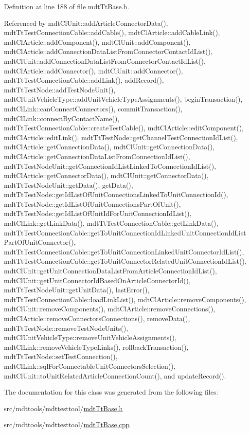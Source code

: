 Definition at line 188 of file mdt\-Tt\-Base.\-h.



Referenced by mdt\-Cl\-Unit\-::add\-Article\-Connector\-Data(), mdt\-Tt\-Test\-Connection\-Cable\-::add\-Cable(), mdt\-Cl\-Article\-::add\-Cable\-Link(), mdt\-Cl\-Article\-::add\-Component(), mdt\-Cl\-Unit\-::add\-Component(), mdt\-Cl\-Article\-::add\-Connection\-Data\-List\-From\-Connector\-Contact\-Id\-List(), mdt\-Cl\-Unit\-::add\-Connection\-Data\-List\-From\-Connector\-Contact\-Id\-List(), mdt\-Cl\-Article\-::add\-Connector(), mdt\-Cl\-Unit\-::add\-Connector(), mdt\-Tt\-Test\-Connection\-Cable\-::add\-Link(), add\-Record(), mdt\-Tt\-Test\-Node\-::add\-Test\-Node\-Unit(), mdt\-Cl\-Unit\-Vehicle\-Type\-::add\-Unit\-Vehicle\-Type\-Assignments(), begin\-Transaction(), mdt\-Cl\-Link\-::can\-Connect\-Connectors(), commit\-Transaction(), mdt\-Cl\-Link\-::connect\-By\-Contact\-Name(), mdt\-Tt\-Test\-Connection\-Cable\-::create\-Test\-Cable(), mdt\-Cl\-Article\-::edit\-Component(), mdt\-Cl\-Article\-::edit\-Link(), mdt\-Tt\-Test\-Node\-::get\-Channel\-Test\-Connection\-Id\-List(), mdt\-Cl\-Article\-::get\-Connection\-Data(), mdt\-Cl\-Unit\-::get\-Connection\-Data(), mdt\-Cl\-Article\-::get\-Connection\-Data\-List\-From\-Connection\-Id\-List(), mdt\-Tt\-Test\-Node\-Unit\-::get\-Connection\-Id\-List\-Linked\-To\-Connection\-Id\-List(), mdt\-Cl\-Article\-::get\-Connector\-Data(), mdt\-Cl\-Unit\-::get\-Connector\-Data(), mdt\-Tt\-Test\-Node\-Unit\-::get\-Data(), get\-Data(), mdt\-Tt\-Test\-Node\-::get\-Id\-List\-Of\-Unit\-Connections\-Linked\-To\-Unit\-Connection\-Id(), mdt\-Tt\-Test\-Node\-::get\-Id\-List\-Of\-Unit\-Connections\-Part\-Of\-Unit(), mdt\-Tt\-Test\-Node\-::get\-Id\-List\-Of\-Unit\-Id\-For\-Unit\-Connection\-Id\-List(), mdt\-Cl\-Link\-::get\-Link\-Data(), mdt\-Tt\-Test\-Connection\-Cable\-::get\-Link\-Data(), mdt\-Tt\-Test\-Connection\-Cable\-::get\-To\-Unit\-Connection\-Id\-Linked\-Unit\-Connection\-Id\-List\-Part\-Of\-Unit\-Connector(), mdt\-Tt\-Test\-Connection\-Cable\-::get\-To\-Unit\-Connection\-Linked\-Unit\-Connector\-Id\-List(), mdt\-Tt\-Test\-Connection\-Cable\-::get\-To\-Unit\-Connector\-Related\-Unit\-Connection\-Id\-List(), mdt\-Cl\-Unit\-::get\-Unit\-Connection\-Data\-List\-From\-Article\-Connection\-Id\-List(), mdt\-Cl\-Unit\-::get\-Unit\-Connector\-Id\-Based\-On\-Article\-Connector\-Id(), mdt\-Tt\-Test\-Node\-Unit\-::get\-Unit\-Data(), last\-Error(), mdt\-Tt\-Test\-Connection\-Cable\-::load\-Link\-List(), mdt\-Cl\-Article\-::remove\-Components(), mdt\-Cl\-Unit\-::remove\-Components(), mdt\-Cl\-Article\-::remove\-Connections(), mdt\-Cl\-Article\-::remove\-Connectors\-Connections(), remove\-Data(), mdt\-Tt\-Test\-Node\-::remove\-Test\-Node\-Units(), mdt\-Cl\-Unit\-Vehicle\-Type\-::remove\-Unit\-Vehicle\-Assignments(), mdt\-Cl\-Link\-::remove\-Vehicle\-Type\-Links(), rollback\-Transaction(), mdt\-Tt\-Test\-Node\-::set\-Test\-Connection(), mdt\-Cl\-Link\-::sql\-For\-Connectable\-Unit\-Connectors\-Selection(), mdt\-Cl\-Unit\-::to\-Unit\-Related\-Article\-Connection\-Count(), and update\-Record().



The documentation for this class was generated from the following files\-:\begin{DoxyCompactItemize}
\item 
src/mdttools/mdttesttool/\hyperlink{mdt_tt_base_8h}{mdt\-Tt\-Base.\-h}\item 
src/mdttools/mdttesttool/\hyperlink{mdt_tt_base_8cpp}{mdt\-Tt\-Base.\-cpp}\end{DoxyCompactItemize}
